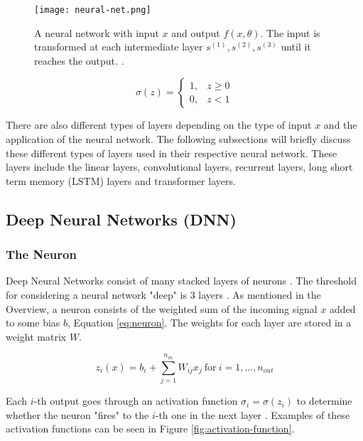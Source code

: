 \begin{figure}[ht]
    \centering
    \texttt{[image: neural-net.png]}
    \caption{A neural network with input $x$ and output $f(x, \theta)$. The input is transformed at each intermediate layer $s^{(1)}, s^{(2)}, s^{(3)}$ until it reaches the output. \cite{robertsPrinciplesDeepLearning2022b}.}
    \label{fig:neural-net}
\end{figure}

\begin{equation}
    \label{eq:perceptron}
    \sigma(z) = \begin{cases} 
        1, & z \geq 0 \\
        0, & z < 1
    \end{cases}
\end{equation}

There are also different types of layers depending on the type of input $x$ and the application of the neural network. The following subsections will briefly discuss these different types of layers used in their respective neural network. These layers include the linear layers, convolutional layers, recurrent layers, long short term memory (LSTM) layers and transformer layers.

\subsection{Deep Neural Networks (DNN)} \label{subsec:DNN}
\subsubsection{The Neuron}
Deep Neural Networks consist of many stacked layers of neurons \cite{robertsPrinciplesDeepLearning2022b}. The threshold for considering a neural network "deep" is 3 layers \cite{WhatNeuralNetwork2021}. As mentioned in the Overview, a neuron consists of the weighted sum of the incoming signal $x$ added to some bias $b$, Equation \ref{eq:neuron}. The weights for each layer are stored in a weight matrix $W$.

\begin{equation}
    \label{eq:neuron}
    z_i(x) = b_i + \sum^{n_{in}}_{j=1}{W_{ij}x_j} \: \text{for} \: i=1,...,n_{out}
\end{equation}

Each $i$-th output goes through an activation function $\sigma_i = \sigma(z_i)$ to determine whether the neuron "fires" to the $i$-th one in the next layer \cite{robertsPrinciplesDeepLearning2022b}. Examples of these activation functions can be seen in Figure \ref{fig:activation-function}. 

